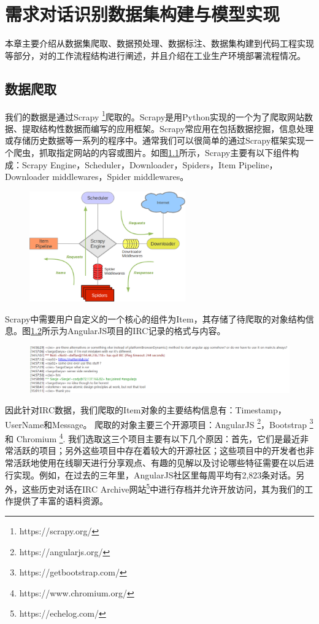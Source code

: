 \chapter{需求对话识别数据集构建与模型实现}

本章主要介绍从数据集爬取、数据预处理、数据标注、数据集构建到代码工程实现等部分，对{\tool}的工作流程结构进行阐述，并且介绍{\tool}在工业生产环境部署流程情况。
\section{数据爬取}
我们的数据是通过Scrapy \footnote{https://scrapy.org/}爬取的。Scrapy是用Python实现的一个为了爬取网站数据、提取结构性数据而编写的应用框架。Scrapy常应用在包括数据挖掘，信息处理或存储历史数据等一系列的程序中。通常我们可以很简单的通过Scrapy框架实现一个爬虫，抓取指定网站的内容或图片。如图\ref{fig:scrapy}所示，Scrapy主要有以下组件构成：Scrapy Engine，Scheduler，Downloader，Spiders，Item Pipeline，Downloader middlewares，Spider middlewares。
\begin{figure}[htbp]
    \centering
    \includegraphics[width=0.6\textwidth]{Img/scrapy.png}
    \label{fig:scrapy}
\end{figure}
Scrapy中需要用户自定义的一个核心的组件为Item，其存储了待爬取的对象结构信息。图\ref{fig:echelog}所示为AngularJS项目的IRC记录的格式与内容。
\begin{figure}[htbp]
    \centering
    \includegraphics[width=\textwidth]{Img/echelog.png}
    \label{fig:echelog}
\end{figure}
因此针对IRC数据，我们爬取的Item对象的主要结构信息有：Timestamp，UserName和Message。
爬取的对象主要三个开源项目：AngularJS \footnote{https://angularjs.org/}，Bootstrap  \footnote{https://getbootstrap.com/}和 Chromium \footnote{https://www.chromium.org/}. 我们选取这三个项目主要有以下几个原因：首先，它们是最近非常活跃的项目；另外这些项目中存在着较大的开源社区；这些项目中的开发者也非常活跃地使用在线聊天进行分享观点、有趣的见解以及讨论哪些特征需要在以后进行实现。例如，在过去的三年里，AngularJS社区里每周平均有2,823条对话。另外，这些历史对话在IRC Archive网站\footnote{https://echelog.com/}中进行存档并允许开放访问，其为我们的工作提供了丰富的语料资源。

